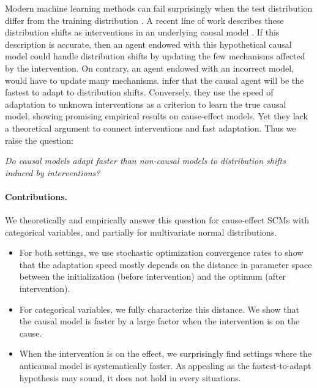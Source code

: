 Modern machine learning methods can fail surprisingly when the test distribution differ from the training distribution \citep{rosenfeld2018elephant}. 
A recent line of work describes these distribution shifts as interventions in an underlying causal model \citep{zhang2013domain, magliacane2018domain}. 
If this description is accurate, then an agent endowed with this hypothetical causal model could handle distribution shifts by updating the few mechanisms affected by the intervention.
On contrary, an agent endowed with an incorrect model, would have to update many mechanisms.
\citet{bengio2019meta} infer that the causal agent will be the fastest to adapt to distribution shifts.
Conversely, they use the speed of adaptation to unknown interventions as a criterion to learn the true causal model, showing promising empirical results on cause-effect models.
Yet they lack a theoretical argument to connect interventions and fast adaptation. Thus we raise the question: 

\textit{Do causal models adapt faster than non-causal models to distribution shifts induced by interventions?}

\paragraph{Contributions.}
We theoretically and empirically answer this question for cause-effect SCMs with categorical variables, and partially  for multivariate normal distributions. 
\begin{itemize}
    \item For both settings, we use stochastic optimization convergence rates to show that the adaptation speed mostly depends on the distance in parameter space between the initialization (before intervention) and the optimum (after intervention).
    \item For categorical variables, we fully characterize this distance. We show that the causal model is faster by a large factor when the intervention is on the cause. 
    \item When the intervention is on the effect, we surprisingly find settings where the anticausal model is systematically faster. As appealing as the fastest-to-adapt hypothesis may sound, it does not hold in every situations.
\end{itemize}


